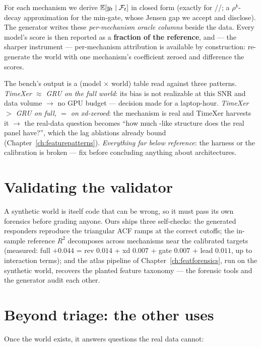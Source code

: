 For each mechanism we derive $\mathbb{E}[y_t \mid \mathcal F_t]$ in closed form
(exactly for //; a $\rho^k$-decay
approximation for the min-gate, whose Jensen gap we accept and disclose).
The generator writes these \emph{per-mechanism oracle columns} beside the
data. Every model's score is then reported as a \textbf{fraction of the
reference}, and --- the sharper instrument --- per-mechanism attribution
is available by construction: re-generate the world with one mechanism's
coefficient zeroed and difference the scores.

\begin{keybox}
The bench's output is a (model $\times$ world) table read against three
patterns. \emph{TimeXer $\approx$ GRU on the full world}: its bias is not
realizable at this SNR and data volume $\to$ no GPU budget --- decision
made for a laptop-hour. \emph{TimeXer $>$ GRU on full, $=$ on
xd-zeroed}: the mechanism is real and TimeXer harvests it $\to$ the
real-data question becomes ``how much -like structure does the
real panel have?'', which the lag ablations already bound
(Chapter~\ref{ch:featurepatterns}). \emph{Everything far below
reference}: the harness or the calibration is broken --- fix before
concluding anything about architectures.
\end{keybox}

\section{Validating the validator}

A synthetic world is itself code that can be wrong, so it must pass its
own forensics before grading anyone. Ours ships three self-checks: the
generated responders reproduce the triangular ACF ramps at the correct
cutoffs; the in-sample reference $R^2$ decomposes across mechanisms near
the calibrated targets (measured: full $+0.044$ = rev $0.014$ + xd
$0.007$ + gate $0.007$ + lead $0.011$, up to interaction terms); and the
atlas pipeline of Chapter~\ref{ch:featforensics}, run on the synthetic
world, recovers the planted feature taxonomy --- the forensic tools and
the generator audit each other.

\section{Beyond triage: the other uses}

Once the world exists, it answers questions the real data cannot:

